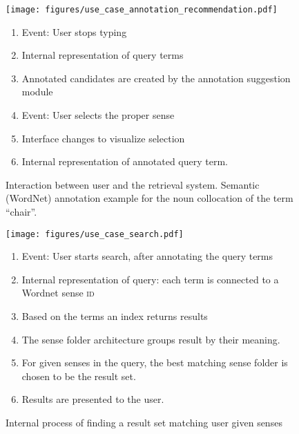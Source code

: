 \documentclass[output=paper]{LSP/langsci}
\begin{document}
\begin{figure}[p!]
	\centering
	\texttt{[image: figures/use\_case\_annotation\_recommendation.pdf]}
	\begin{flushleft}
    \begin{enumerate}\setlength{\parskip}{-5pt}
    	\item Event: User stops typing
    	\item Internal representation of query terms
    	\item Annotated candidates are created by the annotation suggestion module
    	\item Event: User selects the proper sense
    	\item Interface changes to visualize selection
    	\item Internal representation of annotated query term.
    \end{enumerate}
  \end{flushleft}
	\caption{Interaction between user and the retrieval system. Semantic (WordNet) annotation example for the noun collocation of the term ``chair''.}
	\label{fig_RecAnnChair}
\end{figure}

\begin{figure}[p!]
	\centering
	\texttt{[image: figures/use\_case\_search.pdf]}
  \begin{flushleft}
    \begin{enumerate}\setlength{\parskip}{-5pt}
    	\item Event: User starts search, after annotating the query terms
    	\item Internal representation of query: each term is connected to a Wordnet sense \textsc{id}
    	\item Based on the terms an index returns results
    	\item The sense folder architecture groups result by their meaning.
    	\item For given senses in the query, the best matching sense folder is chosen to be the result set.
    	\item Results are presented to the user.
    \end{enumerate}
  \end{flushleft}	
	\caption{Internal process of finding a result set matching user given senses}
	\label{fig_SemSearchChair}
\end{figure}
\end{document}
